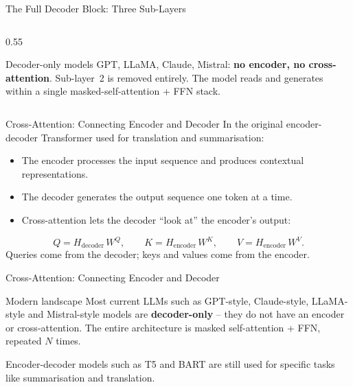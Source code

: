 \documentclass[aspectratio=169]{beamer}
\begin{document}
\begin{frame}{The Full Decoder Block: Three Sub-Layers}
\begin{columns}[T]
\begin{column}{0.55\textwidth}
\medskip
\begin{alertblock}{Decoder-only models}
GPT, LLaMA, Claude, Mistral: \textbf{no encoder, no
cross-attention}. Sub-layer~2 is removed entirely.
The model reads and generates within a single
masked-self-attention + FFN stack.
\end{alertblock}

\end{column}
\end{columns}

\end{frame}
%
%
\begin{frame}{Cross-Attention: Connecting Encoder and Decoder}
  In the original encoder-decoder Transformer used for translation and summarisation:
  \begin{itemize}
    \item The encoder processes the input sequence and produces contextual
          representations.
    \item The decoder generates the output sequence one token at a time.
    \item Cross-attention lets the decoder ``look at'' the encoder's output:
  \end{itemize}
  \medskip
  \[
    Q = H_{\mathrm{decoder}}\,W^Q,
    \qquad
    K = H_{\mathrm{encoder}}\,W^K,
    \qquad
    V = H_{\mathrm{encoder}}\,W^V.
  \]
  \medskip
  Queries come from the decoder; keys and values come from the encoder.
\end{frame}
%
%
\begin{frame}{Cross-Attention: Connecting Encoder and Decoder}
  \begin{block}{Modern landscape}
    Most current LLMs such as GPT-style, Claude-style, LLaMA-style and Mistral-style
    models are \textbf{decoder-only} – they do not have an encoder or cross-attention.
    The entire architecture is masked self-attention + FFN, repeated $N$ times.

    \vspace{0.3em}
    Encoder-decoder models such as T5 and BART are still used for specific tasks like
    summarisation and translation.
  \end{block}
\end{frame}
%
%
\end{document}
